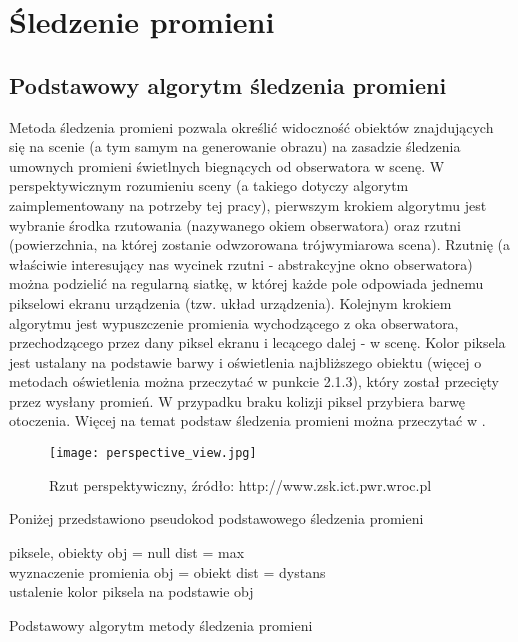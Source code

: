 \section{Śledzenie promieni}

\subsection{Podstawowy algorytm śledzenia promieni}

Metoda śledzenia promieni pozwala określić widoczność obiektów znajdujących
się na scenie (a tym samym na generowanie obrazu) na zasadzie śledzenia umownych promieni świetlnych biegnących od obserwatora w scenę. W perspektywicznym rozumieniu sceny (a takiego dotyczy algorytm zaimplementowany na potrzeby tej pracy), pierwszym krokiem algorytmu jest wybranie środka rzutowania (nazywanego okiem obserwatora) oraz rzutni (powierzchnia, na której zostanie odwzorowana trójwymiarowa scena). Rzutnię (a właściwie interesujący nas wycinek rzutni - abstrakcyjne okno obserwatora) można podzielić na regularną siatkę, w której każde pole odpowiada jednemu pikselowi ekranu urządzenia (tzw. układ urządzenia). Kolejnym krokiem algorytmu jest wypuszczenie promienia wychodzącego z oka obserwatora, przechodzącego przez dany piksel ekranu i lecącego dalej - w scenę. Kolor piksela jest ustalany na podstawie barwy i oświetlenia najbliższego obiektu (więcej o metodach oświetlenia można przeczytać w punkcie 2.1.3), który został przecięty przez wysłany promień. W przypadku braku kolizji piksel przybiera barwę otoczenia. Więcej na temat podstaw śledzenia promieni można przeczytać w \cite{foley95, suffern2007, scratch}.

\begin{figure}[H]
\centering
\texttt{[image: perspective\_view.jpg]}
\caption{Rzut perspektywiczny, źródło: http://www.zsk.ict.pwr.wroc.pl}
\end{figure}

\pagebreak
\noindent
Poniżej przedstawiono pseudokod podstawowego śledzenia promieni

\begin{algorithm}[H]
\begin{algorithmic}
\State piksele, obiekty
\State obj = null
\State dist = max
\\
	 \State wyznaczenie promienia
    		\State obj = obiekt
    		\State dist = dystans
     \EndIf
	 \EndFor
\EndFor
\\
\State ustalenie kolor piksela na podstawie obj
\caption{Podstawowy algorytm metody śledzenia promieni}
\end{algorithmic}
\end{algorithm}

